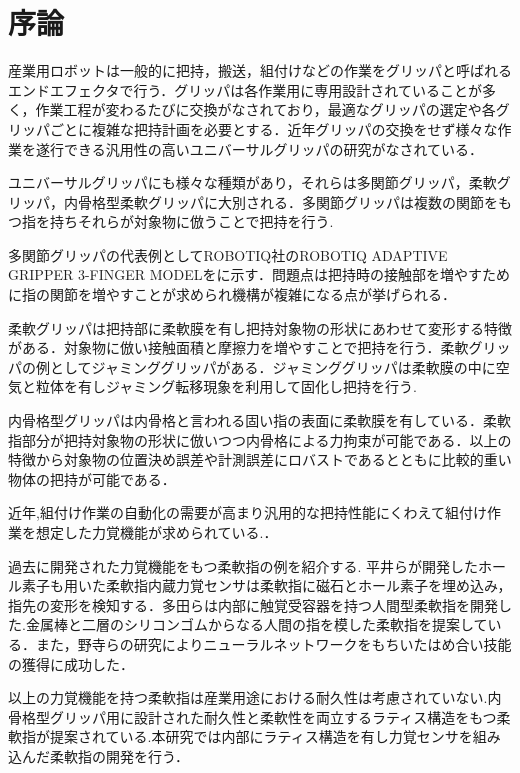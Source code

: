 \section{序論}
\label{sec:序論}
産業用ロボットは一般的に把持，搬送，組付けなどの作業をグリッパと呼ばれるエンドエフェクタで行う．グリッパは各作業用に専用設計されていることが多く，作業工程が変わるたびに交換がなされており，最適なグリッパの選定や各グリッパごとに複雑な把持計画を必要とする\cite{nishida}．近年グリッパの交換をせず様々な作業を遂行できる汎用性の高いユニバーサルグリッパの研究がなされている\cite{end}．\par
ユニバーサルグリッパにも様々な種類があり，それらは多関節グリッパ，柔軟グリッパ，内骨格型柔軟グリッパに大別される．多関節グリッパは複数の関節をもつ指を持ちそれらが対象物に倣うことで把持を行う\cite{takansetsu}.\par
多関節グリッパの代表例としてROBOTIQ社のROBOTIQ ADAPTIVE GRIPPER 3-FINGER MODELをに示す．問題点は把持時の接触部を増やすために指の関節を増やすことが求められ機構が複雑になる点が挙げられる．\par
柔軟グリッパは把持部に柔軟膜を有し把持対象物の形状にあわせて変形する特徴がある．対象物に倣い接触面積と摩擦力を増やすことで把持を行う．柔軟グリッパの例としてジャミンググリッパがある\cite{jam}．ジャミンググリッパは柔軟膜の中に空気と粒体を有しジャミング転移現象を利用して固化し把持を行う. \par
内骨格型グリッパは内骨格と言われる固い指の表面に柔軟膜を有している．柔軟指部分が把持対象物の形状に倣いつつ内骨格による力拘束が可能である．以上の特徴から対象物の位置決め誤差や計測誤差にロバストであるとともに比較的重い物体の把持が可能である．\par
近年,組付け作業の自動化の需要が高まり汎用的な把持性能にくわえて組付け作業を想定した力覚機能が求められている.\cite{sensor}．\par
過去に開発された力覚機能をもつ柔軟指の例を紹介する.
平井らが開発したホール素子も用いた柔軟指内蔵力覚センサは柔軟指に磁石とホール素子を埋め込み，指先の変形を検知する\cite{hole}．多田らは内部に触覚受容器を持つ人間型柔軟指を開発した.金属棒と二層のシリコンゴムからなる人間の指を模した柔軟指を提案している\cite{ningen}．また，野寺らの研究によりニューラルネットワークをもちいたはめ合い技能の獲得に成功した\cite{hameai}．\par
以上の力覚機能を持つ柔軟指は産業用途における耐久性は考慮されていない.内骨格型グリッパ用に設計された耐久性と柔軟性を両立するラティス構造をもつ柔軟指が提案されている.本研究では内部にラティス構造を有し力覚センサを組み込んだ柔軟指の開発を行う．

